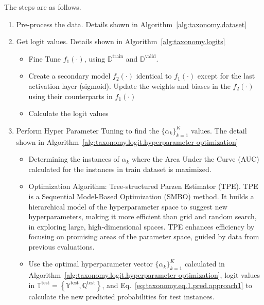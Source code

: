 \documentclass[final,1p,times,authoryear]{elsarticle}
\begin{document}
The steps are as follows.
\begin{enumerate}
    \item Pre-process the data. Details shown in Algorithm~\ref{alg:taxonomy.dataset}
    \item Get logit values. Details shown in Algorithm~\ref{alg:taxonomy.logits}
    \begin{itemize}
        \item Fine Tune $f_1(\cdot)$, using $\mathbb{D}^{\text{train}}$ and $\mathbb{D}^{\text{valid}}$.
        \item Create a secondary model $f_2 (\cdot)$ identical to $f_1(\cdot)$ except for the last activation layer (sigmoid). Update the weights and biases in the $f_2 (\cdot)$ using their counterparts in $f_1(\cdot)$
        \item Calculate the logit values
    \end{itemize}
    \item Perform Hyper Parameter Tuning to find the ${\{\alpha_k \}}_{k=1}^K$ values. The detail shown in Algorithm~\ref{alg:taxonomy.logit.hyperparameter-optimization}
    \begin{itemize}
        \item Determining the instances of $\alpha_k$ where the Area Under the Curve (AUC) calculated for the instances in train dataset is maximized.
        \item Optimization Algorithm: Tree-structured Parzen Estimator (TPE). TPE is a Sequential Model-Based Optimization (SMBO) method. It builds a hierarchical model of the hyperparameter space to suggest new hyperparameters, making it more efficient than grid and random search, in exploring large, high-dimensional spaces. TPE enhances efficiency by focusing on promising areas of the parameter space, guided by data from previous evaluations.
        \item Use the optimal hyperparameter vector ${\{\alpha_k \}}_{k=1}^K$ calculated in Algorithm~\ref{alg:taxonomy.logit.hyperparameter-optimization}, logit values in $\mathbb{T}^{\text{test}}=\left\{ \mathbb{Y}^{\text{test}}, \mathbb{Q}^{\text{test}} \right\}$, and Eq.~\ref{eq:taxonomy.eq.1.pred.approach1} to calculate the new predicted probabilities for test instances.
    \end{itemize}
\end{enumerate}
\end{document}
